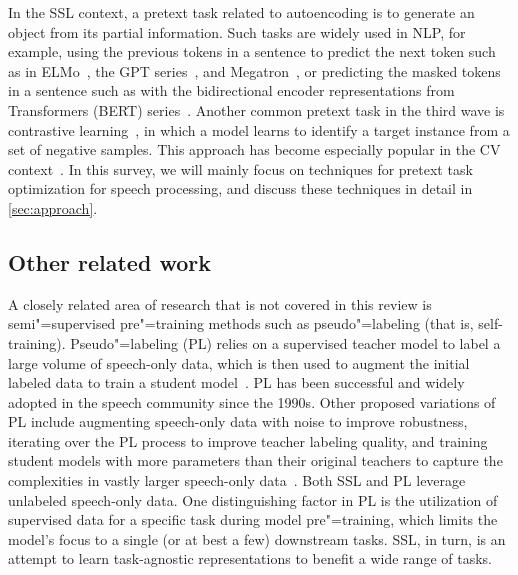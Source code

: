 In the SSL context, a pretext task related to autoencoding is to generate
an object from its partial information. Such tasks are widely used in NLP, for
example, using 
the previous tokens 
in a sentence to predict the next token such as in
ELMo~\parencite{peters_deep_2018}, the GPT
series~\parencite{radford_language_2019}, and 
Megatron~\parencite{shoeybi_megatronlm_2020}, or predicting the masked tokens in a
sentence such as with the bidirectional encoder representations from Transformers
(BERT) series~\parencite{devlin_bert_2018,liu_roberta_2019}. 
Another common pretext task in the third wave is contrastive
learning~\parencite{oord_representation_2018}, in which a model learns to identify a
target instance from a set of negative samples. 
This approach has become especially popular in the
CV context~\parencite{chen_simple_2020,he_momentum_2020,chen_improved_2020,caron_unsupervised_2020}.
In this survey, we will mainly focus on techniques for pretext task
optimization for speech processing, and discuss these techniques in detail
in \cref{sec:approach}.


\subsection{Other related work}
A closely related area of research that is not covered in this review is
semi"=supervised pre"=training methods such as pseudo"=labeling (that is,
self-training). Pseudo"=labeling (PL) relies on a supervised teacher model to
label a large volume of speech-only data, which is then used to augment the
initial labeled data to train a student model~\parencite{kemp_unsupervised_1999, lamel_lightly_2002,
ma_unsupervised_2006, parthasarathi_lessons_2019}. PL has been successful and widely adopted in the
speech community since the 1990s. Other proposed variations of PL include
augmenting speech-only data with noise to improve robustness, iterating
over the PL process to improve teacher labeling quality, and training student
models with more parameters than their original teachers to capture the
complexities in vastly larger speech-only data~\parencite{park_improved_2020,
xu_iterative_2020, xiao_scaling_2021}. 
Both SSL and PL leverage unlabeled speech-only data.
One distinguishing factor in PL is the utilization of supervised data for a
specific task during model pre"=training, which limits the model's focus to
a single (or at best a few) downstream tasks. 
SSL, in turn, is an attempt to learn task-agnostic representations to benefit
a wide range of tasks. 

